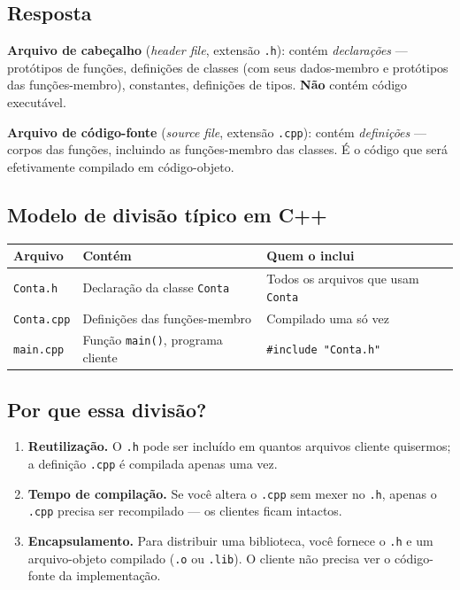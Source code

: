 \documentclass[11pt,a4paper]{article}
\begin{document}
\subsection*{Resposta}

\textbf{Arquivo de cabe\c{c}alho} (\emph{header file}, extens\~ao \texttt{.h}): cont\'em \emph{declara\c{c}\~oes} --- prot\'otipos de fun\c{c}\~oes, defini\c{c}\~oes de classes (com seus dados-membro e prot\'otipos das fun\c{c}\~oes-membro), constantes, defini\c{c}\~oes de tipos. \textbf{N\~ao} cont\'em c\'odigo execut\'avel.

\textbf{Arquivo de c\'odigo-fonte} (\emph{source file}, extens\~ao \texttt{.cpp}): cont\'em \emph{defini\c{c}\~oes} --- corpos das fun\c{c}\~oes, incluindo as fun\c{c}\~oes-membro das classes. \'E o c\'odigo que ser\'a efetivamente compilado em c\'odigo-objeto.

\subsection*{Modelo de divis\~ao t\'ipico em C++}

\begin{center}
\renewcommand{\arraystretch}{1.4}
\begin{tabular}{|p{3cm}|p{5cm}|p{5.5cm}|}
\hline
\textbf{Arquivo} & \textbf{Cont\'em} & \textbf{Quem o inclui} \\
\hline
\texttt{Conta.h}        & Declara\c{c}\~ao da classe \texttt{Conta} & Todos os arquivos que usam \texttt{Conta} \\
\texttt{Conta.cpp}      & Defini\c{c}\~oes das fun\c{c}\~oes-membro & Compilado uma s\'o vez \\
\texttt{main.cpp}       & Fun\c{c}\~ao \texttt{main()}, programa cliente & \texttt{\#include "Conta.h"} \\
\hline
\end{tabular}
\end{center}

\subsection*{Por que essa divis\~ao?}

\begin{enumerate}[leftmargin=*,itemsep=0pt]
  \item \textbf{Reutiliza\c{c}\~ao.} O \texttt{.h} pode ser inclu\'ido em quantos arquivos cliente quisermos; a defini\c{c}\~ao \texttt{.cpp} \'e compilada apenas uma vez.
  \item \textbf{Tempo de compila\c{c}\~ao.} Se voc\^e altera o \texttt{.cpp} sem mexer no \texttt{.h}, apenas o \texttt{.cpp} precisa ser recompilado --- os clientes ficam intactos.
  \item \textbf{Encapsulamento.} Para distribuir uma biblioteca, voc\^e fornece o \texttt{.h} e um arquivo-objeto compilado (\texttt{.o} ou \texttt{.lib}). O cliente n\~ao precisa ver o c\'odigo-fonte da implementa\c{c}\~ao.
\end{enumerate}
\end{document}
